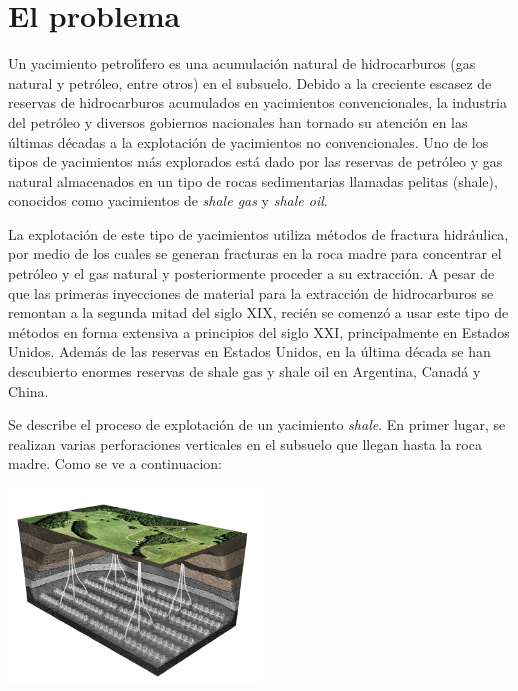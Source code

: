 \newpage
\section{El problema}\label{sec:problema}

Un yacimiento petrol\'\i fero es una acumulaci\'on natural de hidrocarburos (gas natural y petr\'oleo, entre otros) en el subsuelo. Debido a la creciente escasez de reservas de hidrocarburos acumulados en yacimientos convencionales, la industria del petr\'oleo y diversos gobiernos nacionales han tornado su atenci\'on en las \'ultimas d\'ecadas a la explotaci\'on de yacimientos no convencionales. Uno de los tipos de yacimientos m\'as explorados est\'a dado por las reservas de petr\'oleo y gas natural almacenados en un tipo de rocas sedimentarias llamadas pelitas (shale), conocidos como yacimientos de \emph{shale gas} y \emph{shale oil}.
 
La explotaci\'on de este tipo de yacimientos utiliza m\'etodos de fractura hidr\'aulica, por medio de los cuales se generan fracturas en la roca madre para concentrar el petr\'oleo y el gas natural y posteriormente proceder a su extracci\'on. A pesar de que las primeras inyecciones de material para la extracci\'on de hidrocarburos se remontan a la segunda mitad del siglo XIX, reci\'en se comenz\'o a usar este tipo de m\'etodos en forma extensiva a prin\-ci\-pios del siglo XXI, principalmente en Estados Unidos. Adem\'as de las reservas en Estados Unidos, en la \'ultima d\'ecada se han descubierto enormes reservas de shale gas y shale oil en Argentina, Canad\'a y China.

Se describe el proceso de explotaci\'on de un yacimiento \emph{shale}. En primer lugar, se realizan varias perforaciones verticales en el subsuelo que llegan hasta la roca madre. Como se ve a continuacion:

\begin{center}
\includegraphics[width=0.5\textwidth]{imagenes/figura1}
\end{center}

